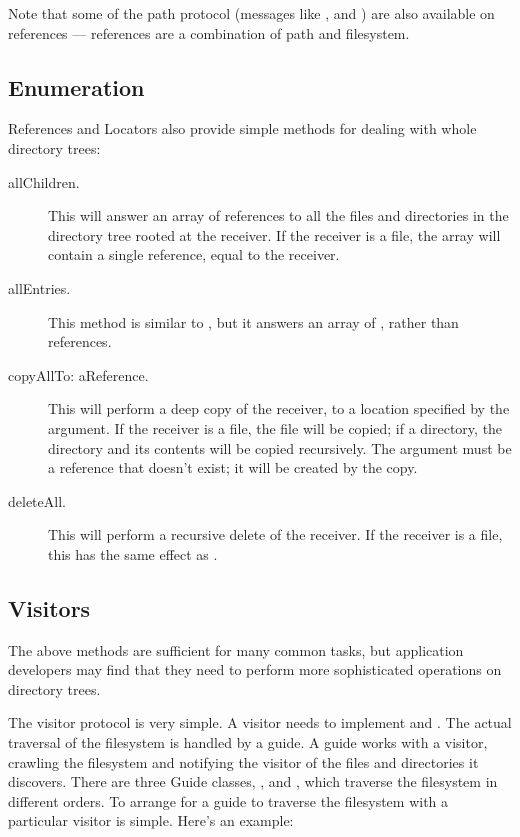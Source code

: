 \documentclass[a4paper,10pt,twoside]{book}
\begin{document}
Note that some of the path protocol (messages like \ct{/},  and ) are also available on references --- references are a combination of path and filesystem. 

\subsection{Enumeration}

References and Locators also provide simple methods for dealing with whole directory trees:

\begin{description}
\item[allChildren.]

This will answer an array of references to all the files and directories in the directory tree rooted at the receiver. If the receiver is a file, the array will contain a single reference, equal to the receiver.

\item[allEntries.]
This method is similar to , but it answers an array of , rather than references.

\item[copyAllTo: aReference.]

This will perform a deep copy of the receiver, to a location specified by the argument. If the receiver is a file, the file will be copied; if a directory, the directory and its contents will be copied recursively. The argument must be a reference that doesn't exist; it will be created by the copy.

\item[deleteAll.]

This will perform a recursive delete of the receiver. If the receiver is a file, this has the same effect as .
\end{description}

\subsection{Visitors}

The above methods are sufficient for many common tasks, but application developers may find that they need to perform more sophisticated operations on directory trees.

The visitor protocol is very simple. A visitor needs to implement  and . The actual traversal of the filesystem is handled by a guide. A guide works with a visitor, crawling the filesystem and notifying the visitor of the files and directories it discovers. There are three Guide classes, ,  and  , which traverse the filesystem in different orders. To arrange for a guide to traverse the filesystem with a particular visitor is simple. Here's an example:
\end{document}
